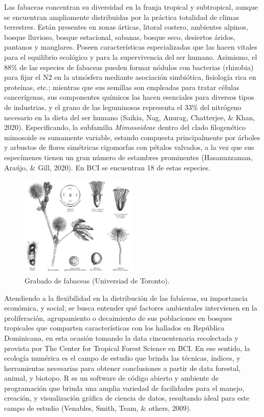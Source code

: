 \documentclass[11pt,]{article}
\begin{document}
Las fabaceas concentran su diversidad en la franja tropical y
subtropical, aunque se encuentran ampliamente distribuidas por la
práctica totalidad de climas terrestres. Están presentes en zonas
árticas, litoral costero, ambientes alpinos, bosque lluvioso, bosque
estacional, sabanas, bosque seco, desiertos áridos, pantanos y
manglares. Poseen características especializadas que las hacen vitales
para el equilibrio ecológico y para la supervivencia del ser humano.
Asimismo, el 88\% de las especies de fabaceas pueden formar nódulos con
bacterias (rhizobia) para fijar el N2 en la atmósfera mediante
asociación simbiótica, fisiología rica en proteínas, etc.; mientras que
sus semillas son empleadas para tratar células cancerígenas, sus
componentes químicos las hacen esenciales para diversos tipos de
industrias, y el grano de las leguminosas representa el 33\% del
nitrógeno necesario en la dieta del ser humano (Saikia, Nag, Anurag,
Chatterjee, \& Khan, 2020). Especificando, la subfamilia
\emph{Mimosoideae} dentro del clado filogenético mimosoide es sumamente
variable, estando compuesta principalmente por árboles y arbustos de
flores simétricas cigomorfas con pétalos valvados, a la vez que sus
especímenes tienen un gran número de estambres prominentes
(Hasanuzzaman, Araújo, \& Gill, 2020). En BCI se encuentran 18 de estas
especies.

\begin{figure}
\centering
\includegraphics[width=0.50000\textwidth]{Grabado-Mimosoideae.png}
\caption{Grabado de fabaceas (Universiad de Toronto). \label{fig:grab}}
\end{figure}

Atendiendo a la flexibilidad en la distribución de las fabáceas, su
importancia económica, y social; se busca entender qué factores
ambientales intervienen en la proliferación, agrupamiento o decaimiento
de sus poblaciones en bosques tropicales que comparten características
con los hallados en República Dominicana, en esta ocasión tomando la
data cincuentenaria recolectada y provista por The Center for Tropical
Forest Science en BCI. En ese sentido, la ecología numérica es el campo
de estudio que brinda las técnicas, índices, y herramientas necesarias
para obtener conclusiones a partir de data forestal, animal, y biotopo.
R es un software de código abierto y ambiente de programación que brinda
una amplia variedad de facilidades para el manejo, creación, y
visualización gráfica de ciencia de datos, resultando ideal para este
campo de estudio (Venables, Smith, Team, \& others, 2009).
\end{document}
